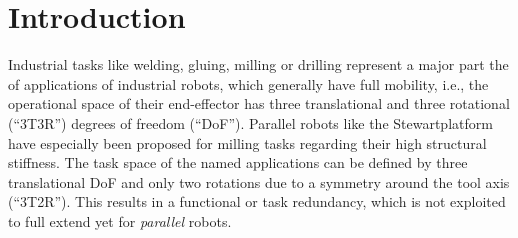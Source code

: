 \documentclass[robotics,article,accept,moreauthors,pdftex]{Definitions/mdpi}
\begin{document}

\section{Introduction}
\label{sec:intro}


Industrial tasks like welding, gluing, milling or drilling represent a major part the of applications of industrial robots, which generally have full mobility, i.e., the operational space of their end-effector has three translational and three rotational (``3T3R'') degrees of freedom (``DoF'').
Parallel robots like the Stewart\replaced[id=Sp]{ }{-}platform have especially been proposed for milling tasks regarding their high structural stiffness.
The task space of the named applications can be defined by three translational DoF and only two rotations due to a symmetry around the tool axis (``3T2R'').
This results in a functional or task redundancy, which is not exploited to full extend yet for \emph{parallel} robots.
\end{document}
